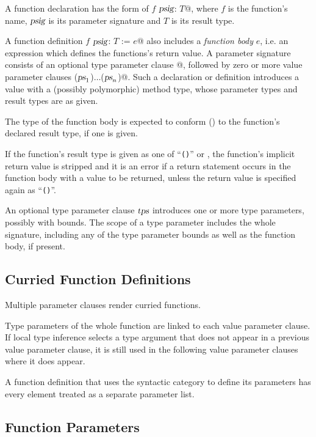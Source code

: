 A function declaration has the form of \lstinline@def $f$ $\mbox{\sl psig}$: $T$@, where $f$ is the function's name, $\mbox{\sl psig}$ is its parameter signature and $T$ is its result type. 

A function definition \lstinline@def $f$ $\mbox{\sl psig}$: $T$ := $e$@ also includes a {\em function body} $e$, i.e. an expression which defines the functions's return value. A parameter signature consists of an optional type parameter clause \lstinline@[$\tps$]@, followed by zero or more value parameter clauses \lstinline@($\mbox{\sl ps}_1$)$\ldots$($\mbox{\sl ps}_n$)@. Such a declaration or definition introduces a value with a (possibly polymorphic) method type, whose parameter types and result types are as given. 

The type of the function body is expected to conform () to the function's declared result type, if one is given. 

If the function's result type is given as one of ``\lstinline!()!'' or , the function's implicit return value is stripped and it is an error if a return statement occurs in the function body with a value to be returned, unless the return value is specified again as ``\lstinline!()!''.

An optional type parameter clause $\tps$ introduces one or more type parameters, possibly with bounds. The scope of a type parameter includes the whole signature, including any of the type parameter bounds as well as the function body, if present. 






\subsection{Curried Function Definitions}

Multiple parameter clauses render curried functions. 

Type parameters of the whole function are linked to each value parameter clause. If local type inference selects a type argument that does not appear in a previous value parameter clause, it is still used in the following value parameter clauses where it does appear. 

A function definition that uses the  syntactic category to define its parameters has every  element treated as a separate parameter list. 






\subsection{Function Parameters}

